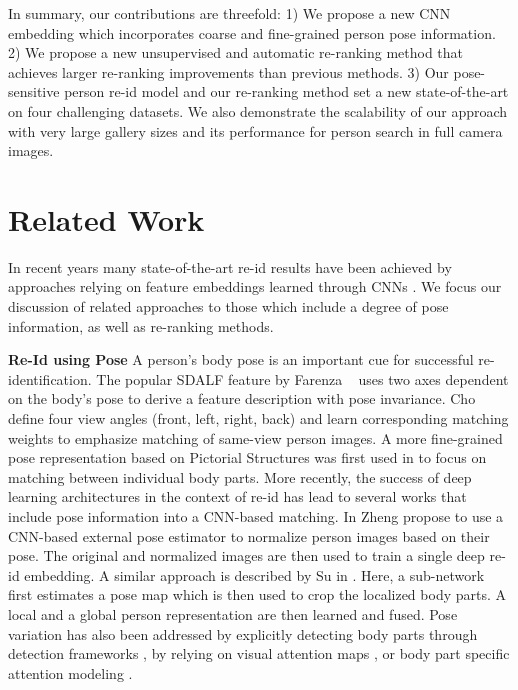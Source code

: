 \documentclass[10pt,twocolumn,letterpaper]{article}
\begin{document}
In summary, our contributions are threefold: 1) We propose a new CNN embedding which incorporates coarse and fine-grained person pose information.  2) We propose a new unsupervised and automatic re-ranking method that achieves larger re-ranking improvements than previous methods.
3) Our pose-sensitive person re-id model and our re-ranking method set a new state-of-the-art on four challenging datasets. We also demonstrate the scalability of our approach with very large gallery sizes
and its performance for person search in full camera images.
 \section{Related Work}
\label{sec:relwork}

In recent years many state-of-the-art re-id results have been achieved by approaches relying on feature embeddings learned through CNNs \cite{zhao2017spindle,hermans2017defense,zhang2017deep,JLML}. We focus our discussion of related approaches to those which include a degree of pose information, as well as re-ranking methods.


\vspace{.1cm}
\noindent\textbf{Re-Id using Pose} 
A person's body pose is an important cue for successful re-identification. The popular SDALF feature by Farenza \etal~\cite{farenzena2010person} uses two axes dependent on the body's pose to derive a feature description with pose invariance. Cho \etal~\cite{cho2016improving} define four view angles (front, left, right, back) and learn corresponding matching weights to emphasize matching of same-view person images.
A more fine-grained pose representation based on Pictorial Structures was first used in \cite{cheng2011custom} to focus on matching between individual body parts.
More recently, the success of deep learning architectures in the context of re-id has lead to several works that include pose information into a CNN-based matching. 
In \cite{zheng2017pose} Zheng \etal propose to use a CNN-based external pose estimator to normalize person images based on their pose. The original and normalized images are then used to train a single deep re-id embedding.
A similar approach is described by Su \etal in \cite{su2017pose}. Here, a sub-network first estimates a pose map which is then used to crop the localized body parts. A local and a global person representation are then learned and fused.
Pose variation has also been addressed by explicitly detecting body parts through detection frameworks \cite{zhao2017spindle}, by relying on visual attention maps \cite{rahimpour2017person}, or body part specific attention modeling \cite{zhao2017deeply}.
\end{document}
